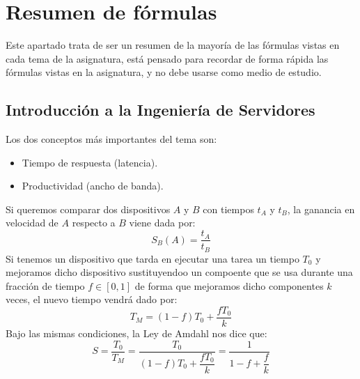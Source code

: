 \chapter{Resumen de fórmulas}
Este apartado trata de ser un resumen de la mayoría de las fórmulas vistas en cada tema de la asignatura, está pensado para recordar de forma rápida las fórmulas vistas en la asignatura, y no debe usarse como medio de estudio.

\section{Introducción a la Ingeniería de Servidores}
Los dos conceptos más importantes del tema son:
\begin{itemize}
    \item Tiempo de respuesta (latencia).
    \item Productividad (ancho de banda).
\end{itemize}
Si queremos comparar dos dispositivos $A$ y $B$ con tiempos $t_A$ y $t_B$, la ganancia en velocidad de $A$ respecto a $B$ viene dada por:
\begin{equation*}
    S_B(A) = \dfrac{t_A}{t_B}
\end{equation*}
Si tenemos un dispositivo que tarda en ejecutar una tarea un tiempo $T_0$ y mejoramos dicho dispositivo sustituyendoo un compoente que se usa durante una fracción de tiempo $f\in [0,1]$ de forma que mejoramos dicho componentes $k$ veces, el nuevo tiempo vendrá dado por:
\begin{equation*}
    T_M = (1-f)T_0 + \dfrac{fT_0}{k}
\end{equation*}
Bajo las mismas condiciones, la Ley de Amdahl nos dice que:
\begin{equation*}
    S = \dfrac{T_0}{T_M} = \dfrac{T_0}{(1-f)T_0 + \dfrac{fT_0}{k}} = \dfrac{1}{1-f+\dfrac{f}{k}}
\end{equation*}

\setcounter{section}{3}
